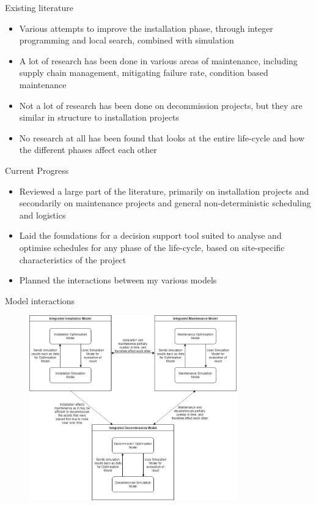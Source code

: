 \documentclass{beamer}
\begin{document}
\begin{frame}{Existing literature}
   \begin{itemize}
  	\item Various attempts to improve the installation phase, through integer programming and local search, combined with simulation
  	\item A lot of research has been done in various areas of maintenance, including supply chain management, mitigating failure rate, condition based maintenance
  	\item Not a lot of research has been done on decommission projects, but they are similar in structure to installation projects
  	\item No research at all has been found that looks at the entire life-cycle and how the different phases affect each other
  \end{itemize}
\end{frame}


\begin{frame}{Current Progress}
   \begin{itemize}
  	\item Reviewed a large part of the literature, primarily on installation projects and secondarily on maintenance projects and general non-deterministic scheduling and logistics
  	\item Laid the foundations for a decision support tool suited to analyse and optimise schedules for any phase of the life-cycle, based on site-specific characteristics of the project
  	\item Planned the interactions between my various models	
  \end{itemize}
\end{frame}


\begin{frame}{Model interactions}
\begin{figure}[t]
  \includegraphics[width=0.8\textwidth]{flowchart}
\centering
\end{figure}
\end{frame}
\end{document}
